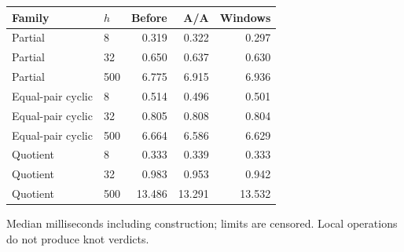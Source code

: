 \begin{center}\small
\begin{tabular}{@{}llrrr@{}}
\toprule
Family & $h$ & Before & A/A & Windows \\
\midrule
Partial & 8 & 0.319 & 0.322 & 0.297 \\
Partial & 32 & 0.650 & 0.637 & 0.630 \\
Partial & 500 & 6.775 & 6.915 & 6.936 \\
Equal-pair cyclic & 8 & 0.514 & 0.496 & 0.501 \\
Equal-pair cyclic & 32 & 0.805 & 0.808 & 0.804 \\
Equal-pair cyclic & 500 & 6.664 & 6.586 & 6.629 \\
Quotient & 8 & 0.333 & 0.339 & 0.333 \\
Quotient & 32 & 0.983 & 0.953 & 0.942 \\
Quotient & 500 & 13.486 & 13.291 & 13.532 \\
\bottomrule
\end{tabular}
\end{center}
Median milliseconds including construction; limits are censored. Local operations do not produce knot verdicts.
